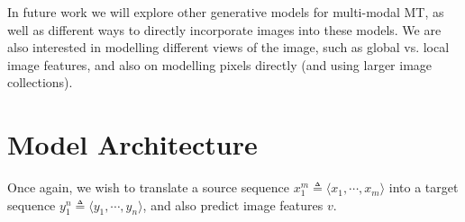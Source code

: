 \documentclass[11pt,a4paper]{article}
\begin{document}
In future work we will explore other generative models for multi-modal MT, as well as different ways to directly incorporate images into these models. We are also interested in modelling different views of the image, such as global vs. local image features, and also on modelling pixels directly (and using larger image collections).
 








\pagebreak
\appendix
\section{Model Architecture}\label{sec:supplementary}
Once again, we wish to translate a source sequence $x_1^m \triangleq \langle x_1, \cdots, x_m \rangle$ into a target sequence $y_1^n \triangleq \langle y_1, \cdots, y_n \rangle$, and also predict image features $v$.
\end{document}
